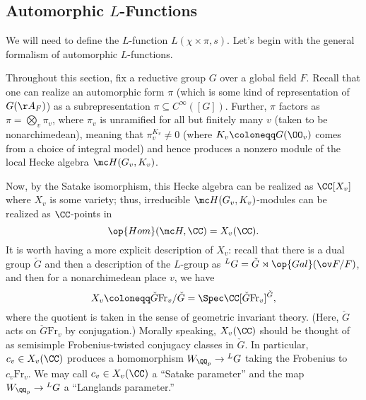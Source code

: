 \documentclass[../notes.tex]{subfiles}
\begin{document}
\subsection{Automorphic \texorpdfstring{ $L$}{ L}-Functions}
We will need to define the $L$-function $L(\chi\times\pi,s)$. Let's begin with the general formalism of automorphic $L$-functions.

Throughout this section, fix a reductive group $G$ over a global field $F$. Recall that one can realize an automorphic form $\pi$ (which is some kind of representation of $G(\AA_F)$) as a subrepresentation $\pi\subseteq C^\infty([G])$. Further, $\pi$ factors as $\pi=\bigotimes_v\pi_v$, where $\pi_v$ is unramified for all but finitely many $v$ (taken to be nonarchimedean), meaning that $\pi_v^{K_v}\ne0$ (where $K_v\coloneqq G(\OO_v)$ comes from a choice of integral model) and hence produces a nonzero module of the local Hecke algebra $\mc H(G_v,K_v)$.

Now, by the Satake isomorphism, this Hecke algebra can be realized as $\CC[X_v]$ where $X_v$ is some variety; thus, irreducible $\mc H(G_v,K_v)$-modules can be realized as $\CC$-points in
\[\op{Hom}(\mc H,\CC)=X_v(\CC).\]
It is worth having a more explicit description of $X_v$: recall that there is a dual group $\check G$ and then a description of the $L$-group as $^LG=\check G\rtimes\op{Gal}(\ov F/F)$, and then for a nonarchimedean place $v$, we have
\[X_v\coloneqq\check G\mathrm{Fr}_v/\check G=\Spec\CC[\check G\mathrm{Fr}_v]^{\check G},\]
where the quotient is taken in the sense of geometric invariant theory. (Here, $\check G$ acts on $\check G\mathrm{Fr}_v$ by conjugation.) Morally speaking, $X_v(\CC)$ should be thought of as semisimple Frobenius-twisted conjugacy classes in $\check G$. In particular, $c_v\in X_v(\CC)$ produces a homomorphism $W_{\QQ_p}\to{^LG}$ taking the Frobenius to $c_v\mathrm{Fr}_v$. We may call $c_v\in X_v(\CC)$ a ``Satake parameter'' and the map $W_{\QQ_p}\to{^LG}$ a ``Langlands parameter.''
\end{document}
